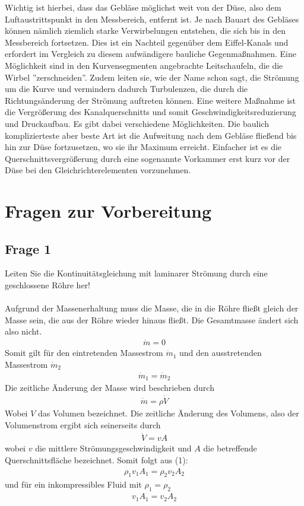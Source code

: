 \documentclass[a4paper,10pt]{scrartcl}
\begin{document}
Wichtig ist hierbei, dass das Gebläse möglichst weit von der Düse, also dem Luftaustrittspunkt in
den Messbereich, entfernt ist. Je nach Bauart des Gebläses können nämlich ziemlich starke Verwirbelungen entstehen, die sich bis in den Messbereich fortsetzen. Dies ist ein Nachteil gegenüber dem
Eiffel-Kanals und erfordert im Vergleich zu diesem aufwändigere bauliche Gegenmaßnahmen. Eine
Möglichkeit sind in den Kurvensegmenten angebrachte Leitschaufeln, die die Wirbel ”zerschneiden”.
Zudem leiten sie, wie der Name schon sagt, die Strömung um die Kurve und vermindern dadurch Turbulenzen, die durch die Richtungsänderung der Strömung auftreten können. Eine weitere Maßnahme
ist die Vergrößerung des Kanalquerschnitts und somit Geschwindigkeitsreduzierung und Druckaufbau. Es gibt dabei verschiedene Möglichkeiten. Die baulich komplizierteste aber beste Art ist die
Aufweitung nach dem Gebläse fließend bis hin zur Düse fortzusetzen, wo sie ihr Maximum erreicht.
Einfacher ist es die Querschnittsvergrößerung durch eine sogenannte Vorkammer erst kurz vor der
Düse bei den Gleichrichterelementen vorzunehmen.

		
	\section{Fragen zur Vorbereitung}
		\subsection{Frage 1}
			Leiten Sie die Kontinuitätsgleichung mit laminarer Strömung durch eine geschlossene Röhre
			her!\\
			\\
			Aufgrund der Massenerhaltung muss die Masse, die in die Röhre fließt gleich der Masse sein, die aus der Röhre wieder hinaus fließt. Die Gesamtmasse ändert sich also nicht.
			\begin{align*}
			\dot m=0
			\end{align*}
			Somit gilt für den eintretenden Massestrom \(\dot m_{1}\) und den ausstretenden Massestrom \(\dot m_{2}\)
			\begin{align}
			\dot m_{1}=\dot m_{2}
			\end{align}
			Die zeitliche Änderung der Masse wird beschrieben durch 
			\begin{align*}
			\dot m=\rho \dot V
			\end{align*}
			Wobei \(V\) das Volumen bezeichnet. Die zeitliche Änderung des Volumens, also der Volumenstrom ergibt sich seinerseits durch
			\begin{align*}
			\dot V=vA
			\end{align*}
			wobei \(v\) die mittlere Strömungsgeschwindigkeit und \(A\) die betreffende Querschnittsfläche bezeichnet. Somit folgt aus (1):
			\begin{align*}
			\rho_{1}v_{1}A_{1}=\rho_{2}v_{2}A_{2}
			\end{align*}
			und für ein inkompressibles Fluid mit \(\rho_{1}=\rho_{2}\)
			\begin{align*}
			v_{1}A_{1}=v_{2}A_{2}
			\end{align*}
			
\end{document}
